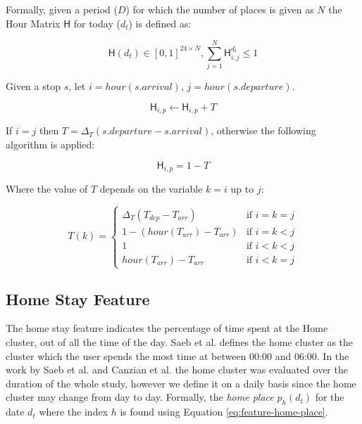 Formally, given a period ($D$) for which the number of places is given as $N$ the Hour Matrix $\mathsf{H}$ for today ($d_t$) is defined as:

\begin{equation}
\label{eq:feature-hour-matrix-def}
\mathsf{H}(d_t) \in [0,1]^{24 \times N}, \sum_{j=1}^N \mathsf{H}^{d_t}_{i,j} \leq 1
\end{equation}

Given a stop $s$, let $i = hour(s.arrival)$, $j = hour(s.departure)$.

\begin{equation}
\label{eq:feature-hour-matrix-computation}
\mathsf{H}_{i,p} \leftarrow \mathsf{H}_{i,p} + T
\end{equation}

If $i = j$ then $T = \Delta_T (s.departure - s.arrival)$, otherwise the following algorithm is applied:

\begin{equation}
\label{eq:feature-hour-computaion2}
\mathsf{H}_{i,p} = 1 - T
\end{equation}

Where the value of $T$ depends on the variable $k = i$ up to $j$:

\begin{equation}
\label{eq:feature-hour-computaion3}
T(k) =
\begin{cases}
    \Delta_T (T_{dep} - T_{arr})    & \text{if $i = k = j$} \\
    1 - (hour(T_{arr}) - T_{arr})   & \text{if $i = k < j$} \\
    1                               & \text{if $i < k < j$} \\
    hour(T_{arr}) - T_{arr}         & \text{if $i < k = j$}
\end{cases}
\end{equation}


\subsection{Home Stay Feature}
The home stay feature indicates the percentage of time spent at the Home cluster, out of all the time of the day. Saeb et al. defines the home cluster as the cluster which the user spends the most time at between 00:00 and 06:00. In the work by Saeb et al. and Canzian et al. \cite{Saeb2015, saeb2016, Canzian2015} the home cluster was evaluated over the duration of the whole study, however we define it on a daily basis since the home cluster may change from day to day. Formally, the \textit{home place} $p_h (d_t)$ for the date $d_t$ where the index $h$ is found using Equation \eqref{eq:feature-home-place}.

